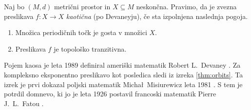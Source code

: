 \begin{definicija}
    Naj bo \((M, d)\) metrični prostor in \(X \subseteq M\) neskončna. Pravimo, da je zvezna preslikava \(f \colon X \to X\) \emph{kaotična} (po Devaneyju), če sta izpolnjena naslednja pogoja.
    \begin{enumerate}
        \item Množica periodičnih točk je gosta v množici \(X\).
        \item Preslikava \(f\) je topološko tranzitivna.
    \end{enumerate}
\end{definicija}

\noindent Pojem kaosa je leta \num{1989} definiral ameriški matematik Robert L.~Devaney \cite{Devaney_1986}. Za kompleksno eksponentno preslikavo kot posledica sledi iz izreka 
\ref{thm:orbits}. Ta izrek je prvi dokazal poljski matematik Micha\l\ Misiurewicz leta \num{1981} \cite{Misiurewicz_1981}. S tem je potrdil domnevo, ki jo je leta \num{1926} postavil francoski matematik Pierre J.~L.~Fatou \cite{Fatou_1926}.